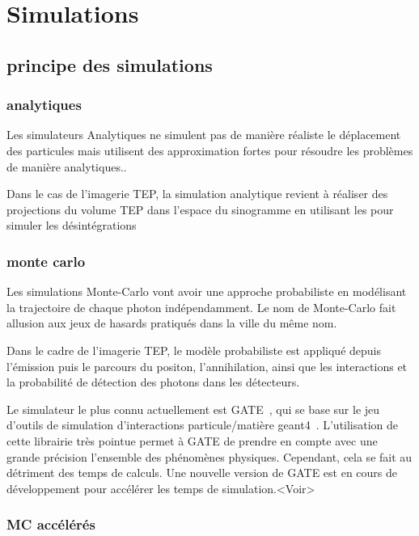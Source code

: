 \chapter{Simulations}
	\section{principe des simulations}

		\subsection{analytiques}

Les simulateurs Analytiques ne simulent pas de manière réaliste le déplacement des particules mais  utilisent des approximation fortes pour résoudre les problèmes de manière analytiques..

Dans le cas de l'imagerie TEP, la simulation analytique revient à réaliser des projections du volume TEP dans l'espace du sinogramme en utilisant les pour simuler les désintégrations 

		\subsection{monte carlo}

Les simulations Monte-Carlo vont avoir une approche probabiliste en modélisant la trajectoire de chaque photon indépendamment. Le nom de Monte-Carlo fait allusion aux jeux de hasards pratiqués dans la ville du même nom.

Dans le cadre de l'imagerie TEP, le modèle probabiliste est appliqué depuis l'émission puis le parcours du positon, l'annihilation, ainsi que les interactions et la probabilité de détection des photons dans les détecteurs. 

Le simulateur le plus connu actuellement est GATE~\cite{jan2004gate}, qui se base sur le jeu d'outils de simulation d'interactions particule/matière geant4~\cite{allison2006geant4}. L'utilisation de cette librairie très pointue permet à GATE de prendre en compte avec une grande précision l'ensemble des phénomènes physiques. Cependant, cela se fait au détriment des temps de calculs. Une nouvelle version de GATE est en cours de développement pour accélérer les temps de simulation.<Voir>




		\subsection{MC accélérés}

